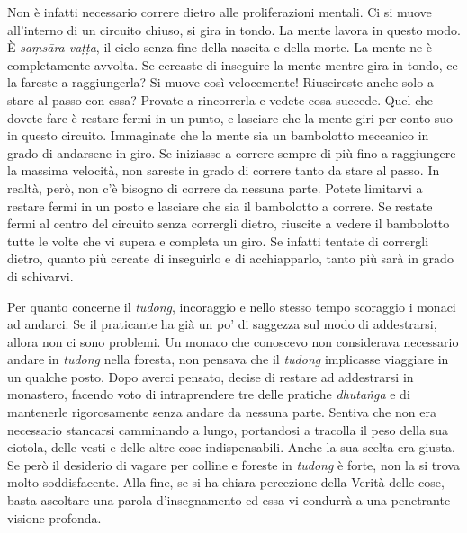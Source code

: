Non è infatti necessario correre dietro alle proliferazioni mentali. Ci
si muove all'interno di un circuito chiuso, si gira in tondo. La mente
lavora in questo modo. È \emph{saṃsāra-vaṭṭa}, il ciclo senza fine della
nascita e della morte. La mente ne è completamente avvolta. Se cercaste
di inseguire la mente mentre gira in tondo, ce la fareste a
raggiungerla? Si muove così velocemente! Riuscireste anche solo a stare
al passo con essa? Provate a rincorrerla e vedete cosa succede. Quel che
dovete fare è restare fermi in un punto, e lasciare che la mente giri
per conto suo in questo circuito. Immaginate che la mente sia un
bambolotto meccanico in grado di andarsene in giro. Se iniziasse a
correre sempre di più fino a raggiungere la massima velocità, non
sareste in grado di correre tanto da stare al passo. In realtà, però,
non c'è bisogno di correre da nessuna parte. Potete limitarvi a restare
fermi in un posto e lasciare che sia il bambolotto a correre. Se restate
fermi al centro del circuito senza corrergli dietro, riuscite a vedere
il bambolotto tutte le volte che vi supera e completa un giro. Se
infatti tentate di corrergli dietro, quanto più cercate di inseguirlo e
di acchiapparlo, tanto più sarà in grado di schivarvi.

Per quanto concerne il \emph{tudong}, incoraggio e nello stesso tempo
scoraggio i monaci ad andarci. Se il praticante ha già un po' di
saggezza sul modo di addestrarsi, allora non ci sono problemi. Un monaco
che conoscevo non considerava necessario andare in \emph{tudong} nella
foresta, non pensava che il \emph{tudong} implicasse viaggiare in un
qualche posto. Dopo averci pensato, decise di restare ad addestrarsi in
monastero, facendo voto di intraprendere tre delle pratiche
\emph{dhutaṅga} e di mantenerle rigorosamente senza andare da nessuna
parte. Sentiva che non era necessario stancarsi camminando a lungo,
portandosi a tracolla il peso della sua ciotola, delle vesti e delle
altre cose indispensabili. Anche la sua scelta era giusta. Se però il
desiderio di vagare per colline e foreste in \emph{tudong} è forte, non
la si trova molto soddisfacente. Alla fine, se si ha chiara percezione
della Verità delle cose, basta ascoltare una parola d'insegnamento ed
essa vi condurrà a una penetrante visione profonda.

